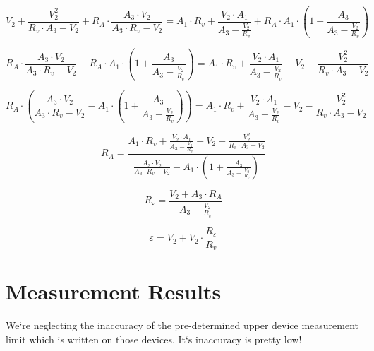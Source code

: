 \documentclass[12pt]{memoir}
\begin{document}
    \begin{equation*}
        V_2 + \frac{V_2^2}{R_v \cdot A_3 - V_2} + R_A \cdot \frac{A_3 \cdot V_2}{A_3 \cdot R_v - V_2} = A_1 \cdot R_v + \frac{V_2 \cdot A_1}{A_3 - \frac{V_2}{R_v}} + R_A \cdot A_1 \cdot \left( 1 + \frac{A_3}{A_3 - \frac{V_2}{R_v}} \right)
    \end{equation*}

    \begin{equation*}
        R_A \cdot \frac{A_3 \cdot V_2}{A_3 \cdot R_v - V_2} - R_A \cdot A_1 \cdot \left( 1 + \frac{A_3}{A_3 - \frac{V_2}{R_v}} \right) = A_1 \cdot R_v + \frac{V_2 \cdot A_1}{A_3 - \frac{V_2}{R_v}} - V_2 - \frac{V_2^2}{R_v \cdot A_3 - V_2}
    \end{equation*}

    \begin{equation*}
        R_A \cdot \left( \frac{A_3 \cdot V_2}{A_3 \cdot R_v - V_2} - A_1 \cdot \left( 1 + \frac{A_3}{A_3 - \frac{V_2}{R_v}} \right) \right) = A_1 \cdot R_v + \frac{V_2 \cdot A_1}{A_3 - \frac{V_2}{R_v}} - V_2 - \frac{V_2^2}{R_v \cdot A_3 - V_2}
    \end{equation*}

    \begin{equation*}
        R_A = \frac{A_1 \cdot R_v + \frac{V_2 \cdot A_1}{A_3 - \frac{V_2}{R_v}} - V_2 - \frac{V_2^2}{R_v \cdot A_3 - V_2}}{\frac{A_3 \cdot V_2}{A_3 \cdot R_v - V_2} - A_1 \cdot \left( 1 + \frac{A_3}{A_3 - \frac{V_2}{R_v}} \right)}
    \end{equation*}

    \begin{equation*}
        R_\varepsilon = \frac{V_2 + A_3 \cdot R_A}{A_3 - \frac{V_2}{R_v}}
    \end{equation*}

    \begin{equation*}
        \varepsilon = V_2 + V_2 \cdot \frac{R_\varepsilon}{R_v}
    \end{equation*}




    \section{Measurement Results}\label{sec:measurement-results}

    We`re neglecting the inaccuracy of the pre-determined upper device measurement limit which is written on those devices.
    It`s inaccuracy is pretty low!
\end{document}
